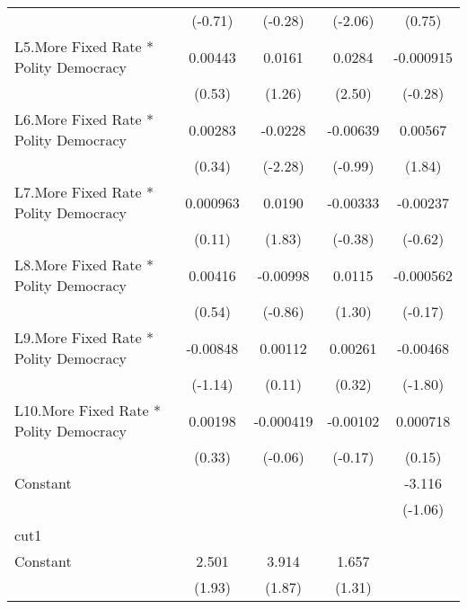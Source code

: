 {\begin{longtable}{l*{4}{c}}
                &  (-0.71)         &  (-0.28)         &  (-2.06)         &   (0.75)         \\
[1em]
L5.More Fixed Rate * Polity Democracy&  0.00443         &   0.0161         &   0.0284\sym{*}  &-0.000915         \\
                &   (0.53)         &   (1.26)         &   (2.50)         &  (-0.28)         \\
[1em]
L6.More Fixed Rate * Polity Democracy&  0.00283         &  -0.0228\sym{*}  & -0.00639         &  0.00567         \\
                &   (0.34)         &  (-2.28)         &  (-0.99)         &   (1.84)         \\
[1em]
L7.More Fixed Rate * Polity Democracy& 0.000963         &   0.0190         & -0.00333         & -0.00237         \\
                &   (0.11)         &   (1.83)         &  (-0.38)         &  (-0.62)         \\
[1em]
L8.More Fixed Rate * Polity Democracy&  0.00416         & -0.00998         &   0.0115         &-0.000562         \\
                &   (0.54)         &  (-0.86)         &   (1.30)         &  (-0.17)         \\
[1em]
L9.More Fixed Rate * Polity Democracy& -0.00848         &  0.00112         &  0.00261         & -0.00468         \\
                &  (-1.14)         &   (0.11)         &   (0.32)         &  (-1.80)         \\
[1em]
L10.More Fixed Rate * Polity Democracy&  0.00198         &-0.000419         & -0.00102         & 0.000718         \\
                &   (0.33)         &  (-0.06)         &  (-0.17)         &   (0.15)         \\
[1em]
Constant        &                  &                  &                  &   -3.116         \\
                &                  &                  &                  &  (-1.06)         \\
\hline
cut1            &                  &                  &                  &                  \\
Constant        &    2.501         &    3.914         &    1.657         &                  \\
                &   (1.93)         &   (1.87)         &   (1.31)         &                  \\

\end{longtable}}
